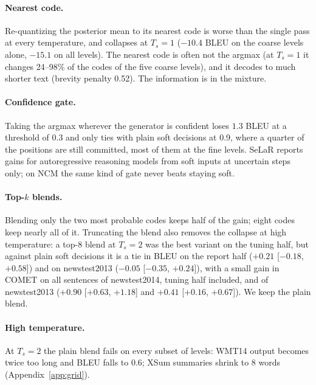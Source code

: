 \documentclass[11pt]{article}
\begin{document}
\paragraph{Nearest code.} Re-quantizing the posterior mean to its nearest code is worse than the
single pass at every temperature, and collapses at $T_s=1$ ($-10.4$ BLEU on the coarse levels alone, $-15.1$ on all
levels). The nearest code is often not the argmax (at $T_s=1$ it changes 24--98\% of the codes of the five coarse levels), and
it decodes to much shorter text (brevity penalty 0.52). The information is in the mixture.

\paragraph{Confidence gate.} Taking the argmax wherever the generator is confident loses $1.3$ BLEU at
a threshold of 0.3 and only ties with plain soft decisions at 0.9, where a quarter of the positions are still committed, most of them
at the fine levels. SeLaR \citep{selar2026} reports gains for autoregressive reasoning models from soft inputs at uncertain steps only;
on NCM the same kind of gate never beats staying soft.

\paragraph{Top-$k$ blends.} Blending only the two most probable codes keeps half of the gain; eight codes
keep nearly all of it. Truncating the blend also removes the collapse at high temperature: a top-8 blend at $T_s=2$
was the best variant on the tuning half, but against plain soft decisions it is a tie in BLEU on the report half
($+0.21$ [$-0.18$, $+0.58$]) and on newstest2013 ($-0.05$ [$-0.35$, $+0.24$]), with a small gain
in COMET on all sentences of newstest2014, tuning half included, and of newstest2013 ($+0.90$ [$+0.63$, $+1.18$] and
$+0.41$ [$+0.16$, $+0.67$]). We keep the plain blend.

\paragraph{High temperature.} At $T_s=2$ the plain blend fails on every subset of levels:
WMT14 output becomes twice too long and BLEU falls to 0.6; XSum summaries shrink to 8 words
(Appendix~\ref{app:grid}).

\end{document}
